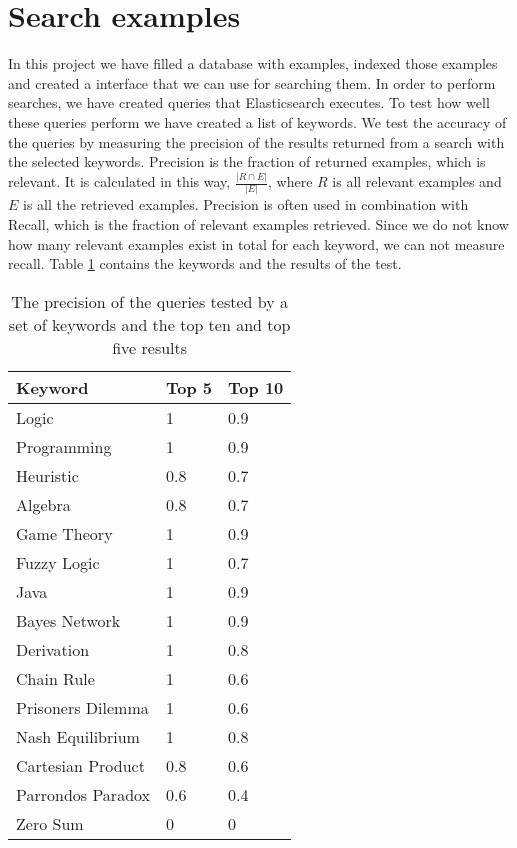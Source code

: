 \section{Search examples} \label{search_experiment}
In this project we have filled a database with examples, indexed those examples and created a interface that we can use for searching them. In order to perform searches, we have created queries that Elasticsearch executes. To test how well these queries perform we have created a list of keywords. We test the accuracy of the queries by measuring the precision of the results returned from a search with the selected  keywords. Precision is the fraction of returned examples, which is relevant. It is calculated in this way, \(\frac{|R \cap E |}{|E|}\), where \(R\) is all relevant examples and \(E\) is all the retrieved examples. Precision is often used in combination with Recall, which is the fraction of relevant examples retrieved. Since we do not know how many relevant examples exist in total for each keyword, we can not measure recall. 
Table \ref{table:precision_test} contains the keywords and the results of the test.


\begin{table}[h!]
\centering
\begin{tabular} {|| p{15em} | p{5em} | p{5em} ||} 
 \hline
 Keyword & Top 5 & Top 10 \\ [0.5ex] 
 \hline

Logic & 1 & 0.9 \\
Programming & 1 & 0.9 \\
Heuristic & 0.8 & 0.7 \\
Algebra & 0.8 & 0.7 \\
Game Theory & 1 & 0.9 \\

Fuzzy Logic & 1 & 0.7 \\
Java & 1 & 0.9 \\
Bayes Network & 1 & 0.9 \\
Derivation & 1 & 0.8 \\

Chain Rule & 1 & 0.6 \\
Prisoners Dilemma & 1 & 0.6 \\
Nash Equilibrium & 1 & 0.8 \\
Cartesian Product & 0.8 & 0.6 \\
Parrondos Paradox & 0.6 & 0.4 \\
Zero Sum & 0 & 0 \\

 \hline
\end{tabular}
\caption{The precision of the queries tested by a set of keywords and the top ten and top five results}
\label{table:precision_test}
\end{table}

